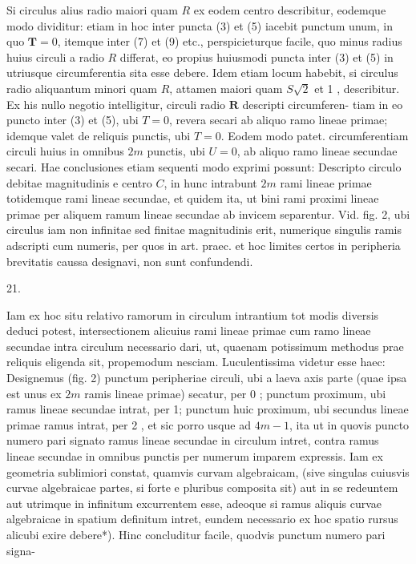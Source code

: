 \documentclass[twoside,12pt, showframe]{memoir}
\begin{document}
Si circulus alius radio maiori quam \(R\) ex eodem centro describitur, eodemque modo dividitur: etiam in hoc inter puncta (3) et (5) iacebit punctum unum, in quo \(\boldsymbol{T}=0\), itemque inter (7) et (9) etc., perspicieturque facile, quo minus radius huius circuli a radio \(R\) differat, eo propius huiusmodi puncta inter (3) et (5) in utriusque circumferentia sita esse debere. Idem etiam locum habebit, si circulus radio aliquantum minori quam \(R\), attamen maiori quam \(S \sqrt{2}\) et 1 , describitur. Ex his nullo negotio intelligitur, circuli radio \(\boldsymbol{R}\) descripti circumferen-
tiam in eo puncto inter (3) et (5), ubi \(T=0\), revera secari ab aliquo ramo lineae primae; idemque valet de reliquis punctis, ubi \(T=0\). Eodem modo patet. circumferentiam circuli huius in omnibus \(2 m\) punctis, ubi \(U=0\), ab aliquo ramo lineae secundae secari. Hae conclusiones etiam sequenti modo exprimi possunt: Descripto circulo debitae magnitudinis e centro \(C\), in hunc intrabunt \(2 m\) rami lineae primae totidemque rami lineae secundae, et quidem ita, ut bini rami proximi lineae primae per aliquem ramum lineae secundae ab invicem separentur. Vid. fig. 2, ubi circulus iam non infinitae sed finitae magnitudinis erit, numerique singulis ramis adscripti cum numeris, per quos in art. praec. et hoc limites certos in peripheria brevitatis caussa designavi, non sunt confundendi.

21.

Iam ex hoc situ relativo ramorum in circulum intrantium tot modis diversis deduci potest, intersectionem alicuius rami lineae primae cum ramo lineae secundae intra circulum necessario dari, ut, quaenam potissimum methodus prae reliquis eligenda sit, propemodum nesciam. Luculentissima videtur esse haec: Designemus (fig. 2) punctum peripheriae circuli, ubi a laeva axis parte (quae ipsa est unus ex \(2 m\) ramis lineae primae) secatur, per 0 ; punctum proximum, ubi ramus lineae secundae intrat, per 1; punctum huic proximum, ubi secundus lineae primae ramus intrat, per 2 , et sic porro usque ad \(4 m-1\), ita ut in quovis puncto numero pari signato ramus lineae secundae in circulum intret, contra ramus lineae secundae in omnibus punctis per numerum imparem expressis. Iam ex geometria sublimiori constat, quamvis curvam algebraicam, (sive singulas cuiusvis curvae algebraicae partes, si forte e pluribus composita sit) aut in se redeuntem aut utrimque in infinitum excurrentem esse, adeoque si ramus aliquis curvae algebraicae in spatium definitum intret, eundem necessario ex hoc spatio rursus alicubi exire debere*). Hinc concluditur facile, quodvis punctum numero pari signa-
\end{document}
